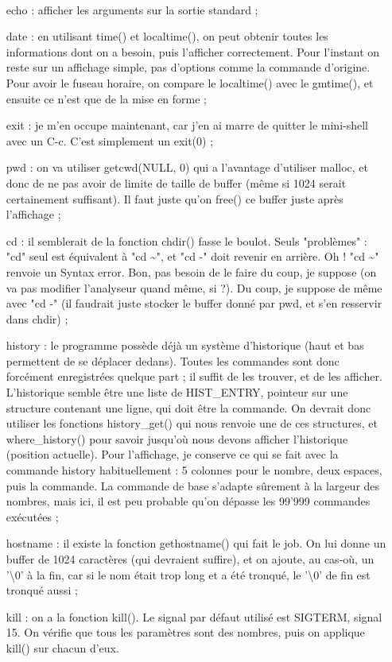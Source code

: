 \\\begin{itemize}
\item[echo :] afficher les arguments sur la sortie standard ;
\\\item[date :] en utilisant time() et localtime(), on peut obtenir toutes les informations dont on a besoin, puis l'afficher correctement. Pour l'instant on reste sur un affichage simple, pas d'options comme la commande d'origine. Pour avoir le fuseau horaire, on compare le localtime() avec le gmtime(), et ensuite ce n'est que de la mise en forme ;
\\\item[exit :] je m'en occupe maintenant, car j'en ai marre de quitter le mini-shell avec un C-c. C'est simplement un exit(0) ;
\\\item[pwd :] on va utiliser getcwd(NULL, 0) qui a l'avantage d'utiliser malloc, et donc de ne pas avoir de limite de taille de buffer (même si 1024 serait certainement suffisant). Il faut juste qu'on free() ce buffer juste après l'affichage ;
\\\item[cd :] il semblerait de la fonction chdir() fasse le boulot. Seuls "problèmes" : "cd" seul est équivalent à "cd \textasciitilde", et "cd -" doit revenir en arrière. Oh ! "cd \textasciitilde" renvoie un Syntax error. Bon, pas besoin de le faire du coup, je suppose (on va pas modifier l'analyseur quand même, si ?). Du coup, je suppose de même avec "cd -" (il faudrait juste stocker le buffer donné par pwd, et s'en resservir dans chdir) ;
\\\item[history :] le programme possède déjà un système d'historique (haut et bas permettent de se déplacer dedans). Toutes les commandes sont donc forcément enregistrées quelque part ; il suffit de les trouver, et de les afficher. L'historique semble être une liste de HIST\_ENTRY, pointeur sur une structure contenant une ligne, qui doit être la commande. On devrait donc utiliser les fonctions history\_get() qui nous renvoie une de ces structures, et where\_history() pour savoir jusqu'où nous devons afficher l'historique (position actuelle). Pour l'affichage, je conserve ce qui se fait avec la commande history habituellement : 5 colonnes pour le nombre, deux espaces, puis la commande. La commande de base s'adapte sûrement à la largeur des nombres, mais ici, il est peu probable qu'on dépasse les 99'999 commandes exécutées ;
\\\item[hostname :] il existe la fonction gethostname() qui fait le job. On lui donne un buffer de 1024 caractères (qui devraient suffire), et on ajoute, au cas-où, un '\textbackslash{0}' à la fin, car si le nom était trop long et a été tronqué, le '\textbackslash{0}' de fin est tronqué aussi ;
\\\item[kill :] on a la fonction kill(). Le signal par défaut utilisé est SIGTERM, signal 15. On vérifie que tous les paramètres sont des nombres, puis on applique kill() sur chacun d'eux.
\\\end{itemize}

